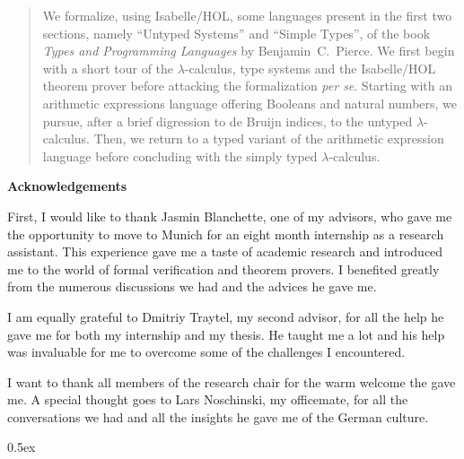 \documentclass[12pt,a4paper,titlepage,oneside]{article}
\makeatletter
\newcommand\ackname{Acknowledgements}
\newenvironment{acknowledgements}{%
      \titlepage
      \null\vfil
      \@beginparpenalty\@lowpenalty
      \begin{center}%
        \bfseries \ackname
        \@endparpenalty\@M
      \end{center}}%
     {\par\vfil\null\endtitlepage}
\newenvironment{acknowledgements}{%
      \if@twocolumn
        \section*{\abstractname}%
      \else
        \small
        \begin{center}%
          {\bfseries \ackname\vspace{-.5em}\vspace{\z@}}%
        \end{center}%
        \quotation
      \fi}
      {\if@twocolumn\else\endquotation\fi}
\makeatother
\begin{document}
\begin{abstract}
We formalize, using Isabelle/HOL, some languages present in the first two sections, namely ``Untyped
Systems'' and ``Simple Types'', of the book \emph{Types and Programming Languages}
\cite{pierce-2002-TAPL} by Benjamin~C.~Pierce. We first begin with a short tour of the
$\lambda$-calculus, type systems and the Isabelle/HOL theorem prover before attacking the
formalization \emph{per se}. Starting with an arithmetic expressions language offering Booleans and
natural numbers, we pursue, after a brief digression to de Bruijn indices, to the untyped
$\lambda$-calculus. Then, we return to a typed variant of the arithmetic expression language before
concluding with the simply typed $\lambda$-calculus.
\end{abstract}

\newpage
\null
\newpage

\begin{acknowledgements}
  First, I would like to thank Jasmin Blanchette, one of my advisors, who gave me the opportunity to
  move to Munich for an eight month internship as a research assistant. This experience gave me a
  taste of academic research and introduced me to the world of formal verification and theorem
  provers. I benefited greatly from the numerous discussions we had and the advices he gave me.

  I am equally grateful to Dmitriy Traytel, my second advisor, for all the help he gave me for
  both my internship and my thesis. He taught me a lot and his help was invaluable for me to
  overcome some of the challenges I encountered.

  I want to thank all members of the research chair for the warm welcome the gave me. A special
  thought goes to Lars Noschinski, my officemate, for all the conversations we had and all the
  insights he gave me of the German culture.
\end{acknowledgements}

\newpage
\null
\newpage

\tableofcontents

\newpage
\null
\newpage

\pagestyle{headings}





\parindent 0pt\parskip 0.5ex










\nocite{*}



%
%
\end{document}
